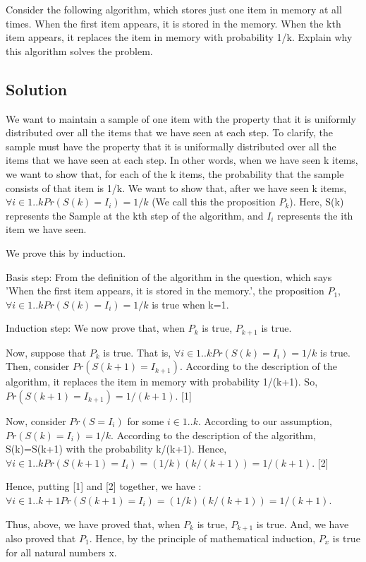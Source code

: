 \documentclass[10pt]{article}
\begin{document}
Consider the following algorithm, which stores just one item in memory at all times. When the first item appears, it is stored in the memory. When the kth item appears, it replaces the item in memory with probability 1/k. Explain why this algorithm solves the problem.

\subsection{Solution}

We want to maintain a sample of one item with the property that it is uniformly distributed over all the items that we have seen at each step. To clarify, the sample must have the property that it is uniformally distributed over all the items that we have seen at each step. In other words, when we have seen k items, we want to show that, for each of the k items, the probability that the sample consists of that item is 1/k. We want to show that, after we have seen k items, $\forall i \in {1 .. k} Pr(S(k)=I_{i})=1/k$ (We call this the proposition $P_{k}$). Here, S(k) represents the Sample at the kth step of the algorithm, and $I_{i}$ represents the ith item we have seen.

We prove this by induction.

Basis step: From the definition of the algorithm in the question, which says 'When the first item appears, it is stored in the memory.', the proposition $P_{1}$, $\forall i \in {1 .. k} Pr(S(k)=I_{i})=1/k$ is true when k=1.

Induction step: We now prove that, when $P_{k}$ is true, $P_{k+1}$ is true.

Now, suppose that $P_{k}$ is true. That is, $\forall i \in {1 .. k} Pr(S(k)=I_{i})=1/k$ is true. Then, consider $Pr(S(k+1)=I_{k+1})$. According to the description of the algorithm, it replaces the item in memory with probability 1/(k+1). So, $Pr(S(k+1)=I_{k+1})=1/(k+1)$. [1]

Now, consider $Pr(S=I_{i})$ for some $i \in {1 .. k} $. According to our assumption, $Pr(S(k)=I_{i})=1/k$. According to the description of the algorithm, S(k)=S(k+1) with the probability k/(k+1). Hence, $\forall i \in {1 .. k} Pr(S(k+1)=I_{i})=(1/k)(k/(k+1))=1/(k+1)$. [2]

Hence, putting [1] and [2] together, we have : $\forall i \in {1 .. k+1} Pr(S(k+1)=I_{i})=(1/k)(k/(k+1))=1/(k+1)$.

Thus, above, we have proved that, when $P_{k}$ is true, $P_{k+1}$ is true. And, we have also proved that $P_{1}$. Hence, by the principle of mathematical induction, $P_{x}$ is true for all natural numbers x.
\end{document}
